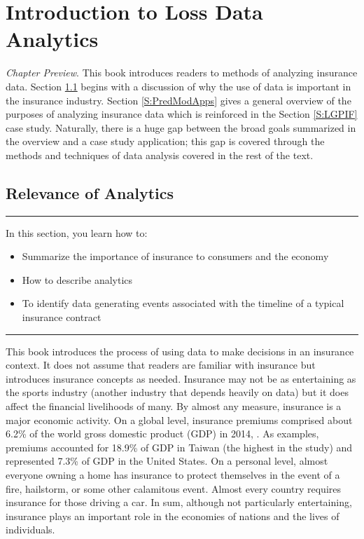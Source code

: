 \documentclass[]{book}
\providecommand{\tightlist}{%
  \setlength{\itemsep}{0pt}\setlength{\parskip}{0pt}}
\theoremstyle{definition}
\theoremstyle{definition}
\theoremstyle{definition}
\theoremstyle{remark}
\begin{document}
\chapter{Introduction to Loss Data Analytics}\label{C:Intro}

\emph{Chapter Preview}. This book introduces readers to methods of
analyzing insurance data. Section \ref{S:Intro} begins with a discussion
of why the use of data is important in the insurance industry. Section
\ref{S:PredModApps} gives a general overview of the purposes of
analyzing insurance data which is reinforced in the Section
\ref{S:LGPIF} case study. Naturally, there is a huge gap between the
broad goals summarized in the overview and a case study application;
this gap is covered through the methods and techniques of data analysis
covered in the rest of the text.

\section{Relevance of Analytics}\label{S:Intro}

\begin{center}\rule{0.5\linewidth}{\linethickness}\end{center}

In this section, you learn how to:

\begin{itemize}
\tightlist
\item
  Summarize the importance of insurance to consumers and the economy
\item
  How to describe analytics
\item
  To identify data generating events associated with the timeline of a
  typical insurance contract
\end{itemize}

\begin{center}\rule{0.5\linewidth}{\linethickness}\end{center}

This book introduces the process of using data to make decisions in an
insurance context. It does not assume that readers are familiar with
insurance but introduces insurance concepts as needed. Insurance may not
be as entertaining as the sports industry (another industry that depends
heavily on data) but it does affect the financial livelihoods of many.
By almost any measure, insurance is a major economic activity. On a
global level, insurance premiums comprised about 6.2\% of the world
gross domestic product (GDP) in 2014, \citep{III2016}. As examples,
premiums accounted for 18.9\% of GDP in Taiwan (the highest in the
study) and represented 7.3\% of GDP in the United States. On a personal
level, almost everyone owning a home has insurance to protect themselves
in the event of a fire, hailstorm, or some other calamitous event.
Almost every country requires insurance for those driving a car. In sum,
although not particularly entertaining, insurance plays an important
role in the economies of nations and the lives of individuals.
\end{document}
